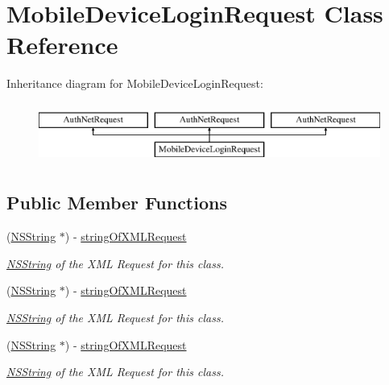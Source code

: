\hypertarget{interface_mobile_device_login_request}{
\section{MobileDeviceLoginRequest Class Reference}
\label{interface_mobile_device_login_request}
}
Inheritance diagram for MobileDeviceLoginRequest:\begin{figure}[H]
\begin{center}
\leavevmode
\includegraphics[height=2.000000cm]{interface_mobile_device_login_request}
\end{center}
\end{figure}
\subsection*{Public Member Functions}
\begin{DoxyCompactItemize}
\item 
(\hyperlink{class_n_s_string}{NSString} $\ast$) -\/ \hyperlink{interface_mobile_device_login_request_ab67f6cb7f99436880f34570b74db8803}{stringOfXMLRequest}
\begin{DoxyCompactList}\small\item\em \hyperlink{class_n_s_string}{NSString} of the XML Request for this class. \item\end{DoxyCompactList}\item 
(\hyperlink{class_n_s_string}{NSString} $\ast$) -\/ \hyperlink{interface_mobile_device_login_request_ab67f6cb7f99436880f34570b74db8803}{stringOfXMLRequest}
\begin{DoxyCompactList}\small\item\em \hyperlink{class_n_s_string}{NSString} of the XML Request for this class. \item\end{DoxyCompactList}\item 
(\hyperlink{class_n_s_string}{NSString} $\ast$) -\/ \hyperlink{interface_mobile_device_login_request_ab67f6cb7f99436880f34570b74db8803}{stringOfXMLRequest}
\begin{DoxyCompactList}\small\item\em \hyperlink{class_n_s_string}{NSString} of the XML Request for this class. \item\end{DoxyCompactList}\end{DoxyCompactItemize}
